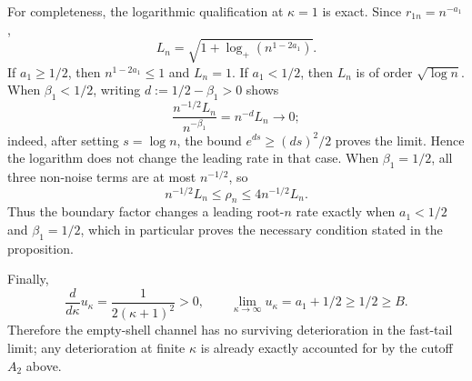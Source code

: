 For completeness, the logarithmic qualification at \(\kappa=1\) is exact.  Since \(r_{1n}=n^{-a_1}\),
\[
L_n=\sqrt{1+\log_+(n^{1-2a_1})}.
\]
If \(a_1\geq1/2\), then \(n^{1-2a_1}\leq1\) and \(L_n=1\).  If \(a_1<1/2\), then \(L_n\) is of order \(\sqrt{\log n}\).  When \(\beta_1<1/2\), writing \(d:=1/2-\beta_1>0\) shows
\[
\frac{n^{-1/2}L_n}{n^{-\beta_1}}=n^{-d}L_n\longrightarrow0;
\]
indeed, after setting \(s=\log n\), the bound \(e^{ds}\geq (ds)^2/2\) proves the limit.  Hence the logarithm does not change the leading rate in that case.  When \(\beta_1=1/2\), all three non-noise terms are at most \(n^{-1/2}\), so
\[
n^{-1/2}L_n\leq\rho_n\leq4n^{-1/2}L_n.
\]
Thus the boundary factor changes a leading root-\(n\) rate exactly when \(a_1<1/2\) and \(\beta_1=1/2\), which in particular proves the necessary condition stated in the proposition.

Finally,
\[
\frac{d}{d\kappa}u_\kappa=\frac{1}{2(\kappa+1)^2}>0,
\qquad
\lim_{\kappa\to\infty}u_\kappa=a_1+1/2\geq1/2\geq B.
\]
Therefore the empty-shell channel has no surviving deterioration in the fast-tail limit; any deterioration at finite \(\kappa\) is already exactly accounted for by the cutoff \(A_2\) above.
